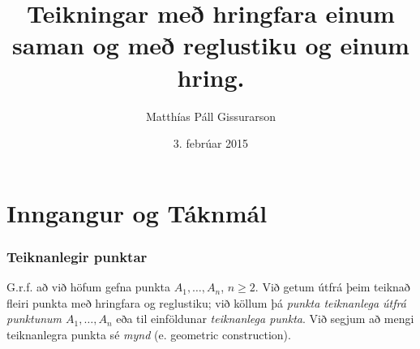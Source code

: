 %  





\usepackage[utf8]{inputenc}
\usepackage{url}



\title{Teikningar með hringfara einum saman og með reglustiku og einum hring.}
\author{Matthías Páll Gissurarson}
\date{3. febrúar 2015}




\frame{\titlepage}
\section{Inngangur og Táknmál}


\begin{frame}
  \frametitle{Teiknanlegir punktar}
  \begin{skgr}
    G.r.f. að við höfum gefna punkta \(A_1, \dotsc, A_n\), \(n \geq 2\).
    Við getum útfrá þeim teiknað fleiri punkta með hringfara og reglustiku;
    við köllum þá \emph{punkta teiknanlega útfrá punktunum \(A_1, \dotsc, A_n\)}
    eða til einföldunar \emph{teiknanlega punkta}. Við segjum að
    mengi teiknanlegra punkta sé {\em mynd} (e. geometric construction).
  \end{skgr}
\end{frame}

